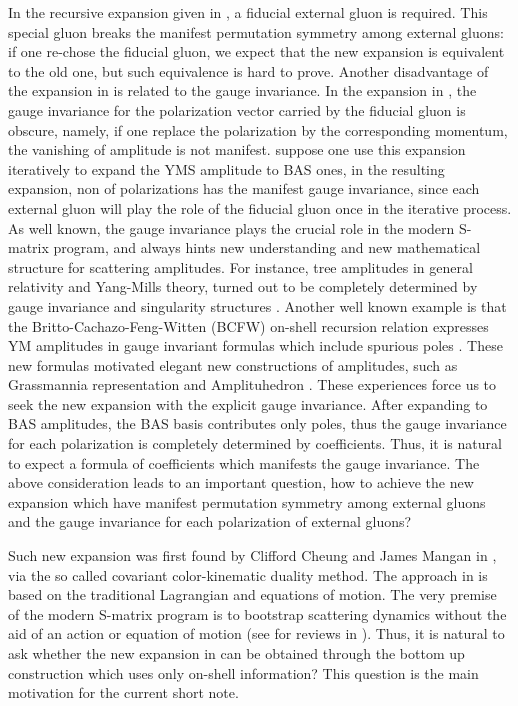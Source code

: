 \documentclass[preprint,showpacs,onecolumn,nofootinbib]{revtex4}
\begin{document}
In the recursive expansion given in \cite{Fu:2017uzt,Teng:2017tbo,Feng:2019tvb}, a fiducial external gluon is required. This special gluon breaks the manifest permutation symmetry among external gluons: if one re-chose the fiducial gluon, we expect that the new expansion is equivalent to the old one, but such equivalence is hard to prove. Another disadvantage of the expansion in \cite{Fu:2017uzt,Teng:2017tbo,Feng:2019tvb} is related to the gauge invariance. In the expansion in \cite{Fu:2017uzt,Teng:2017tbo,Feng:2019tvb}, the gauge invariance for the polarization vector carried by the fiducial gluon is obscure, namely, if one replace the polarization by the corresponding momentum, the vanishing of amplitude is not manifest. suppose one use this expansion iteratively to expand the YMS amplitude to BAS ones, in the resulting expansion, non of polarizations has the manifest gauge invariance, since each external gluon will play the role of the fiducial gluon once in the iterative process. As well known, the gauge invariance plays the crucial role in the modern S-matrix program, and always hints new understanding and new mathematical structure for scattering amplitudes.
For instance, tree amplitudes in general relativity and Yang-Mills theory, turned out to be completely determined by gauge invariance and singularity structures \cite{Arkani-Hamed:2016rak,Rodina:2016jyz}. Another well known example is that the Britto-Cachazo-Feng-Witten (BCFW) on-shell recursion relation expresses YM amplitudes in gauge invariant formulas which include spurious poles \cite{Britto:2004ap,Britto:2005fq}. These new formulas motivated elegant new constructions of amplitudes, such as Grassmannia representation and Amplituhedron \cite{Arkani-Hamed:2012zlh,Arkani-Hamed:2013jha,Arkani-Hamed:2013kca}. These experiences force us to seek the new expansion with the explicit gauge invariance. After expanding to BAS amplitudes, the BAS basis contributes only poles, thus the gauge invariance for each polarization is completely determined by coefficients. Thus, it is natural to expect a formula of coefficients which manifests the gauge invariance. The above consideration leads to an important question, how to achieve the new expansion which have manifest permutation symmetry among external gluons and the gauge invariance for each polarization of external gluons?

Such new expansion was first found by Clifford Cheung and James Mangan in \cite{Cheung:2021zvb}, via the so called covariant color-kinematic duality method. The approach in \cite{Cheung:2021zvb} is based on the traditional Lagrangian and equations of motion. The very premise of the modern S-matrix program is to bootstrap scattering dynamics without the aid of an action or equation of motion (see for reviews in \cite{Elvang:2013cua,Cheung:2017pzi}). Thus, it is natural to ask whether the new expansion in \cite{Cheung:2021zvb} can be obtained through the bottom up construction which uses only on-shell information? This question is the main motivation for the current short note.
\end{document}
